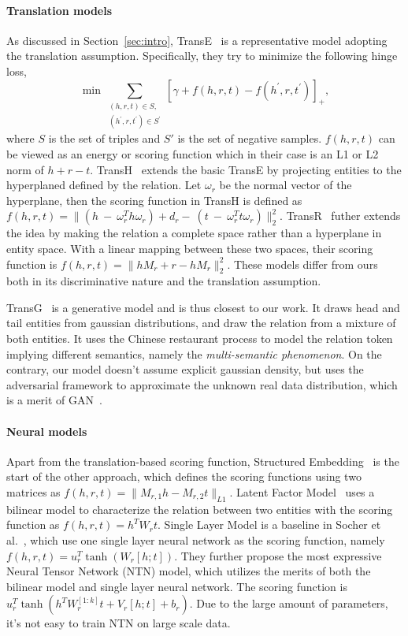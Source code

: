 \documentclass[twocolumn,a4paper,10pt,preprint,3p]{elsarticle}
\begin{document}
\paragraph{Translation models} As discussed in Section~\ref{sec:intro}, TransE~\cite{TransE2013} is a representative model adopting the translation assumption. Specifically, they try to minimize the following hinge loss,
\begin{equation}
    \min\sum_{\substack{(h, r, t)\in S,\\ (h^\prime, r, t^\prime)\in S^\prime }}
        {\left[\gamma + f(h, r, t) - f(h^\prime, r, t^\prime)\right]}_+, \label{eq:TransE}
\end{equation}
where $S$ is the set of triples and $S'$ is the set of negative samples. $f(h, r, t)$ can be viewed as an energy or scoring function which in their case is an L1 or L2 norm of $h + r - t$. TransH~\cite{TransH2014} extends the basic TransE by projecting entities to the hyperplaned defined by the relation. Let $\omega_r$ be the normal vector of the hyperplane, then the scoring function in TransH is defined as $f(h, r, t) = \lVert(h~-~\omega_r^T h \omega_r) + d_r -~(t~-~\omega_r^T t \omega_r)\rVert_2^2 $.
TransR~\cite{TransR2015} futher extends the idea by making the relation a complete space rather than a hyperplane in entity space. With a linear mapping between these two spaces, their scoring function is $f(h, r, t) = \lVert hM_r + r - h M_r \rVert_2^2$. These models differ from ours both in its discriminative nature and the translation assumption.

TransG~\cite{TransG} is a generative model and is thus closest to our work. It draws head and tail entities from gaussian distributions, and draw the relation from a mixture of both entities. It uses the Chinese restaurant process to model the relation token implying different semantics, namely the \emph{multi-semantic phenomenon}.
On the contrary, our model doesn't assume explicit gaussian density, but uses the adversarial framework to approximate the unknown real data distribution, which is a merit of GAN~\cite{Goodfellow_2016}.

\paragraph{Neural models} Apart from the translation-based scoring function, Structured Embedding~\cite{bordes2011structured_embedding} is the start of the other approach, which defines the scoring functions using two matrices as $f(h, r, t) = \lVert M_{r,1}h - M_{r,2}t \rVert_{L1}$. Latent Factor Model~\cite{jenatton2012bilinear} uses a bilinear model to characterize the relation between two entities with the scoring function as $f(h, r, t) = h^T W_r t$.
Single Layer Model is a baseline in Socher et al.~\cite{NTN}, which use one single layer neural network as the scoring function, namely $f(h, r, t)=u_r^T \tanh(W_r[h;t])$. They further propose the most expressive Neural Tensor Network (NTN) model, which utilizes the merits of both the bilinear model and single layer neural network. The scoring function is $u_r^T \tanh(h^T W_r^{[1:k]}t + V_r[h;t] + b_r)$. Due to the large amount of parameters, it's not easy to train NTN on large scale data.
\end{document}

